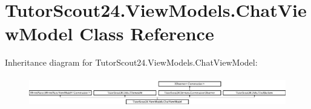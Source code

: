 \hypertarget{class_tutor_scout24_1_1_view_models_1_1_chat_view_model}{}\section{Tutor\+Scout24.\+View\+Models.\+Chat\+View\+Model Class Reference}
\label{class_tutor_scout24_1_1_view_models_1_1_chat_view_model}
Inheritance diagram for Tutor\+Scout24.\+View\+Models.\+Chat\+View\+Model\+:\begin{figure}[H]
\begin{center}
\leavevmode
\includegraphics[height=1.329114cm]{class_tutor_scout24_1_1_view_models_1_1_chat_view_model}
\end{center}
\end{figure}
